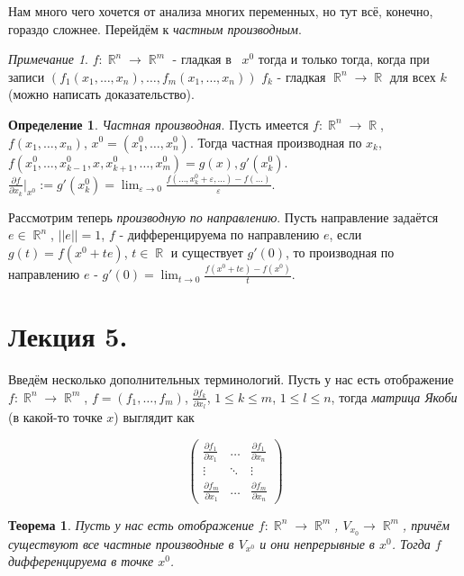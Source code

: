 \documentclass[a4paper,100pt]{article}
\theoremstyle{indented}
\newtheorem{theorem}{Теорема}
\theoremstyle{definition}
\newtheorem{defn}{Определение}
\theoremstyle{remark}
\newtheorem{remark}{Примечание}
\DeclareMathOperator{\RR}{\mathbb{R}}
\begin{document}
Нам много чего хочется от анализа многих переменных, но тут всё, конечно, гораздо сложнее. Перейдём к \textit{частным производным}.

\begin{remark}
    $f:\RR^n\rightarrow \RR^m$ - гладкая в  $x^0$ тогда и только тогда, когда  при записи $(f_1(x_1, \ldots, x_n), \ldots, f_m(x_1, \ldots, x_n))$ $f_k$ - гладкая $\RR^n\rightarrow \RR$ для всех $k$ (можно написать доказательство). 
\end{remark}  

\begin{defn}
    \textit{Частная производная}. Пусть имеется $f:\RR^n\rightarrow \RR$, $f(x_1, \ldots, x_n)$, $x^0=(x_1^0, \ldots, x_n^0)$. Тогда частная производная по $x_k $, $f(x_1^0, \ldots, x_{k-1}^0, x, x_{k+1}^0, \ldots, x_m^0)=g(x), g'(x_k^0)$. $\frac{\partial f}{\partial x_k}\bigg|_{x^0}:=g'(x_k^0)=\lim_{\varepsilon\rightarrow 0}\frac{f(\ldots, x_k^0+\varepsilon, \ldots)-f(\ldots)}{\varepsilon}$. 
\end{defn}

Рассмотрим теперь \textit{производную по направлению}. Пусть направление задаётся $e\in\RR^n$, $||e||=1$, $f$ - дифференцируема по направлению $e$, если $g(t)=f(x^0+te)$, $t\in\RR$ и существует $g'(0)$, то производная по направлению $e$ - $g'(0)=\lim_{t\rightarrow 0}\frac{f(x^0+te)-f(x^0)}{t}$.  

\section{Лекция 5.}

Введём несколько дополнительных терминологий. Пусть у нас есть отображение $f:\RR^n\rightarrow \RR^m$, $f=(f_1, \ldots, f_m)$, $\frac{\partial f_k}{\partial x_l}$, $1\leq k\leq m$, $1\leq l\leq n$, тогда \textit{матрица Якоби} (в какой-то точке $x$) выглядит как

\begin{equation*}
    \begin{pmatrix}
        \frac{\partial f_1}{\partial x_1} & \dots & \frac{\partial f_1}{\partial x_n} \\
        \vdots & \ddots & \vdots \\
        \frac{\partial f_m}{\partial x_1} & \dots & \frac{\partial f_m}{\partial x_n}
    \end{pmatrix}
\end{equation*}

\begin{theorem}
    Пусть у нас есть отображение $f:\RR^n\rightarrow \RR^m$, $V_{x_0}\rightarrow \RR^m$, причём существуют все частные производные в $V_{x^0}$ и они непрерывные в $x^0$. Тогда $f$ дифференцируема в точке $x^0$. 
\end{theorem}
\end{document}

